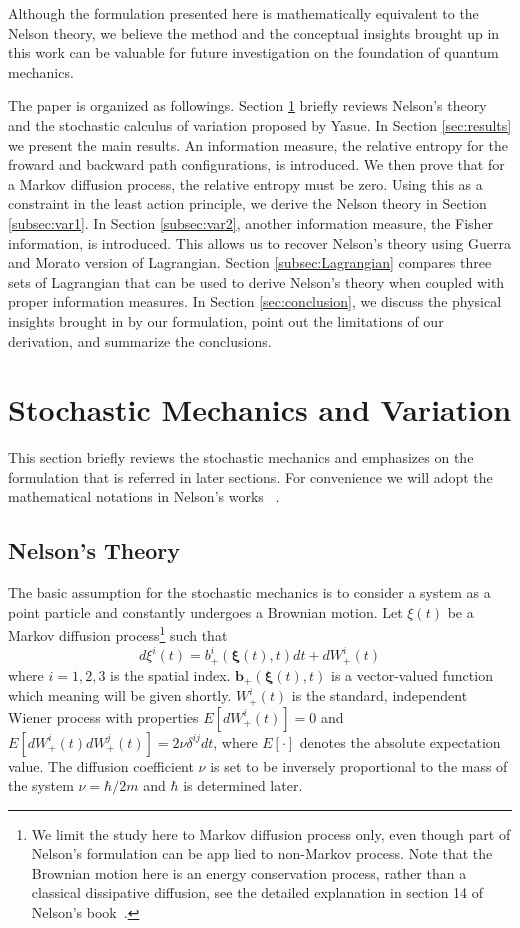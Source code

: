 \documentclass[%
 aip, 
 amsmath,amssymb,amsthm,
 nofootinbib,
 reprint,
]{revtex4-1}
\begin{document}
Although the formulation presented here is mathematically equivalent to the Nelson theory, we believe the method and the conceptual insights brought up in this work can be valuable for future investigation on the foundation of quantum mechanics.

The paper is organized as followings. Section \ref{sec:concept} briefly reviews Nelson's theory and the stochastic calculus of variation proposed by Yasue. In Section \ref{sec:results} we present the main results. An information measure, the relative entropy for the froward and backward path configurations, is introduced. We then prove that for a Markov diffusion process, the relative entropy must be zero. Using this as a constraint in the least action principle, we derive the Nelson theory in Section \ref{subsec:var1}. In Section \ref{subsec:var2}, another information measure, the Fisher information, is introduced. This allows us to recover Nelson's theory using Guerra and Morato version of Lagrangian. Section \ref{subsec:Lagrangian} compares three sets of Lagrangian that can be used to derive Nelson's theory when coupled with proper information measures. In Section \ref{sec:conclusion}, we discuss the physical insights brought in by our formulation, point out the limitations of our derivation, and summarize the conclusions. 

\section{Stochastic Mechanics and Variation}
\label{sec:concept}
This section briefly reviews the stochastic mechanics and emphasizes on the formulation that is referred in later sections. For convenience we will adopt the mathematical notations in Nelson's works ~\cite{Nelsonbook}.

\subsection{Nelson's Theory}
\label{subsec:definition}
The basic assumption for the stochastic mechanics is to consider a system as a point particle and constantly undergoes a Brownian motion. Let $\xi(t)$ be a Markov diffusion process\footnote{We limit the study here to Markov diffusion process only, even though part of Nelson's formulation can be app
lied to non-Markov process. Note that the Brownian motion here is an energy conservation process, rather than a classical dissipative diffusion, see the detailed explanation in section 14 of Nelson's book~\cite{Nelsonbook}.} such that
\begin{equation}
\label{fwd}
    d\xi^i(t) = b^i_+(\mathbf{\xi}(t), t)dt + dW^i_+(t)
\end{equation}
where $i=1,2,3$ is the spatial index. $\mathbf{b}_+(\mathbf{\xi}(t),t)$ is a vector-valued function which meaning will be given shortly. $W_+^i(t)$ is the standard, independent Wiener process with properties $E[dW_+^i(t)] =0$ and $E[dW^i_+(t)dW^j_+(t)] = 2\nu\delta^{ij}dt$, where $E[\cdot]$ denotes the absolute expectation value. The diffusion coefficient $\nu$ is set to be inversely proportional to the mass of the system $\nu = \hbar/2m$ and $\hbar$ is determined later.
\end{document}
